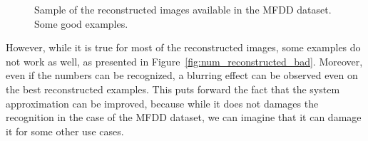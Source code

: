 \begin{figure}[h]
    \caption{Sample of the reconstructed images available in the MFDD dataset. Some good examples.}
\label{fig:num_reconstructed}
\end{figure}

However, while it is true for most of the reconstructed images, some examples do not work as well, as presented in Figure~\ref{fig:num_reconstructed_bad}. Moreover, even if the numbers can be recognized, a blurring effect can be observed even on the best reconstructed examples. This puts forward the fact that the system approximation can be improved, because while it does not damages the recognition in the case of the MFDD dataset, we can imagine that it can damage it for some other use cases.

